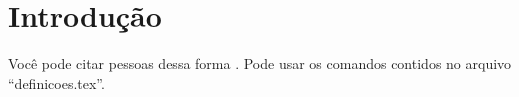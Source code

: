 \pagestyle{fancy}

\chapter{Introdução}
\label{cap1}

Você pode citar pessoas dessa forma \cite{FreundSchapire1995}. Pode usar os comandos
contidos no arquivo ``definicoes.tex''.
